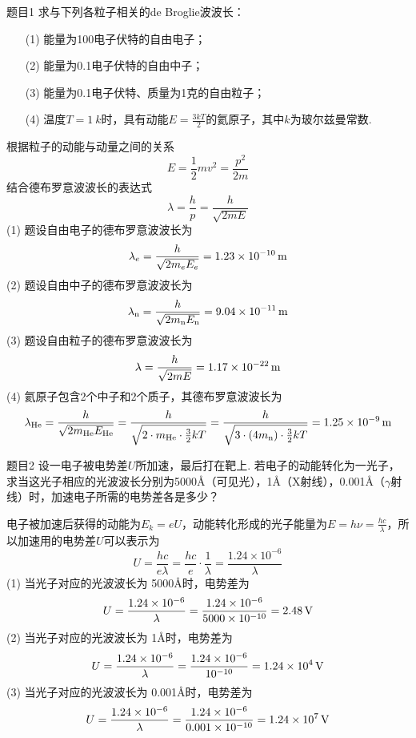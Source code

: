 \begin{question}{题目1}
    求与下列各粒子相关的de Broglie波波长：
    \begin{enumerate}
        \item[(1)] 能量为100电子伏特的自由电子；
        \item[(2)] 能量为0.1电子伏特的自由中子；
        \item[(3)] 能量为0.1电子伏特、质量为1克的自由粒子；
        \item[(4)] 温度$T=\qty{1}{k}$时，具有动能$E=\frac{3kT}{2}$的氦原子，其中$k$为玻尔兹曼常数.
    \end{enumerate}
\end{question}
\begin{solution}
    根据粒子的动能与动量之间的关系
    \begin{equation}\label{能量与动量关系}
        E=\frac{1}{2}mv^2=\frac{p^2}{2m}
    \end{equation}
    结合德布罗意波波长的表达式
    \begin{equation}\label{德布罗意关系}
        \lambda=\frac{h}{p}=\frac{h}{\sqrt{2mE}}
    \end{equation}
    (1) 题设自由电子的德布罗意波波长为
    $$
        \lambda_{e}=\frac{h}{\sqrt{2m_eE_e}}=1.23\times10^{-10}\,{\rm m}
    $$
    (2) 题设自由中子的德布罗意波波长为
    $$
        \lambda_{\rm n}=\frac{h}{\sqrt{2m_{\rm n}E_{\rm n}}}=9.04\times10^{-11}\,{\rm m}
    $$
    (3) 题设自由粒子的德布罗意波波长为
    $$
        \lambda=\frac{h}{\sqrt{2mE}}=1.17\times10^{-22} \,{\rm m}
    $$
    (4) 氦原子包含2个中子和2个质子，其德布罗意波波长为
    $$
        \lambda_{\rm He}=\frac{h}{\sqrt{2m_{\rm He}E_{\rm He}}}
        =\frac{h}{\sqrt{2 \cdot m_{\rm He}\cdot\frac{3}{2}kT}}
        =\frac{h}{\sqrt{3\cdot(4m_{\rm n})\cdot\frac{3}{2}kT}}
        =1.25\times10^{-9} \,{\rm m}
    $$
\end{solution}

\begin{question}{题目2}
    设一电子被电势差$U$所加速，最后打在靶上. 若电子的动能转化为一光子，求当这光子相应的光波波长分别为5000\AA（可见光），1\AA（X射线），0.001\AA（$\gamma$射线）时，加速电子所需的电势差各是多少？
\end{question}
\begin{solution}
    电子被加速后获得的动能为$E_k=eU$，动能转化形成的光子能量为$E=h\nu=\frac{hc}{\lambda}$，所以加速用的电势差$U$可以表示为
    $$
        U=\frac{hc}{e\lambda}
        =\frac{hc}{e}\cdot\frac{1}{\lambda}
        =\frac{1.24\times10^{-6}}{\lambda}
    $$
    (1) 当光子对应的光波波长为 5000\AA 时，电势差为
    $$
        U=\frac{1.24\times10^{-6}}{\lambda}
        =\frac{1.24\times10^{-6}}{5000\times10^{-10}}
        =2.48\,\rm{V}
    $$
    (2) 当光子对应的光波波长为 1\AA 时，电势差为
    $$
        U=\frac{1.24\times10^{-6}}{\lambda}
        =\frac{1.24\times10^{-6}}{10^{-10}}
        =1.24\times10^4\,\rm{V}
    $$
    (3) 当光子对应的光波波长为 0.001\AA 时，电势差为
    $$
        U=\frac{1.24\times10^{-6}}{\lambda}
        =\frac{1.24\times10^{-6}}{0.001\times10^{-10}}
        =1.24\times10^{7}\,\rm{V}
    $$
\end{solution}

